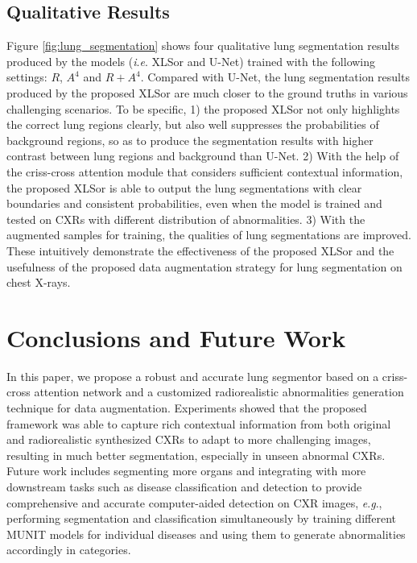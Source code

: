 \documentclass{midl} \usepackage{multirow}
\newcommand{\ie}{\textit{i}.\textit{e}. }
\newcommand{\eg}{\textit{e}.\textit{g}., }
\begin{document}
\subsection{Qualitative Results}
Figure \ref{fig:lung_segmentation} shows four qualitative lung segmentation results produced by the models (\ie XLSor and U-Net) trained with the following settings: $R$, $A^4$ and $R+A^4$. Compared with U-Net, the lung segmentation results produced by the proposed XLSor are much closer to the ground truths in various challenging scenarios. To be specific, 1) the proposed XLSor not only highlights the correct lung regions clearly, but also well suppresses the probabilities of background regions, so as to produce the segmentation results
with higher contrast between lung regions and background than U-Net. 2) With the help of the criss-cross attention module that considers sufficient contextual information, the proposed XLSor is able to output the lung segmentations with clear boundaries and consistent probabilities, even when the model is trained and tested on CXRs with different distribution of abnormalities. 3) With the augmented samples for training, the qualities of lung segmentations are improved. These intuitively demonstrate the effectiveness of the proposed XLSor and the usefulness of the proposed data augmentation strategy for lung segmentation on chest X-rays. 

\section{Conclusions and Future Work}
In this paper, we propose a robust and accurate lung segmentor based on a criss-cross attention network and a customized radiorealistic abnormalities generation technique for data augmentation. Experiments showed that the proposed framework was able to capture rich contextual information from both original and radiorealistic synthesized CXRs to adapt to more challenging images, resulting in much better segmentation, especially in unseen abnormal CXRs. Future work includes segmenting more organs and integrating with more downstream tasks such as disease classification and detection to provide comprehensive and accurate computer-aided detection on CXR images, \eg performing segmentation and classification simultaneously by training different MUNIT models for individual diseases and using them to generate abnormalities accordingly in categories.



\end{document}
